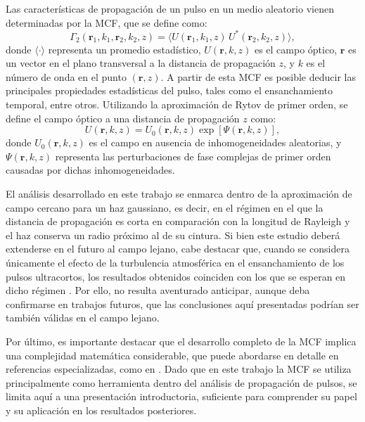 Las características de propagación de un pulso en un medio aleatorio vienen determinadas por la MCF, que se define como:
\begin{equation}
\Gamma_2(\mathbf{r}_1, k_1, \mathbf{r}_2, k_2, z) = \langle U(\mathbf{r}_1, k_1, z)\, U^*(\mathbf{r}_2, k_2, z) \rangle,
\end{equation}
donde $\langle \cdot \rangle$ representa un promedio estadístico, $U(\mathbf{r}, k, z)$ es el campo óptico, $\mathbf{r}$ es un vector en el plano transversal a la distancia de propagación $z$, y $k$ es el número de onda en el punto $(\mathbf{r}, z)$. A partir de esta MCF es posible deducir las principales propiedades estadísticas del pulso, tales como el ensanchamiento temporal, entre otros. Utilizando la aproximación de Rytov de primer orden, se define el campo óptico a una distancia de propagación $z$ como:
\begin{equation}
U(\mathbf{r}, k, z) = U_{0}(\mathbf{r}, k, z) \exp \left[ \Psi(\mathbf{r}, k, z) \right],
\end{equation}
donde $U_{0}(\mathbf{r}, k, z)$ es el campo en ausencia de inhomogeneidades aleatorias, y $\Psi(\mathbf{r}, k, z)$ representa las perturbaciones de fase complejas de primer orden causadas por dichas inhomogeneidades.

El análisis desarrollado en este trabajo se enmarca dentro de la aproximación de campo cercano para un haz gaussiano, es decir, en el régimen en el que la distancia de propagación es corta en comparación con la longitud de Rayleigh y el haz conserva un radio próximo al de su cintura. Si bien este estudio deberá extenderse en el futuro al campo lejano, cabe destacar que, cuando se considera únicamente el efecto de la turbulencia atmosférica en el ensanchamiento de los pulsos ultracortos, los resultados obtenidos coinciden con los que se esperan en dicho régimen \cite{Andrews}. Por ello, no resulta aventurado anticipar, aunque deba confirmarse en trabajos futuros, que las conclusiones aquí presentadas podrían ser también válidas en el campo lejano.

Por último, es importante destacar que el desarrollo completo de la MCF implica una complejidad matemática considerable, que puede abordarse en detalle en referencias especializadas, como en \cite{Andrews}. Dado que en este trabajo la MCF se utiliza principalmente como herramienta dentro del análisis de propagación de pulsos, se limita aquí a una presentación introductoria, suficiente para comprender su papel y su aplicación en los resultados posteriores.

